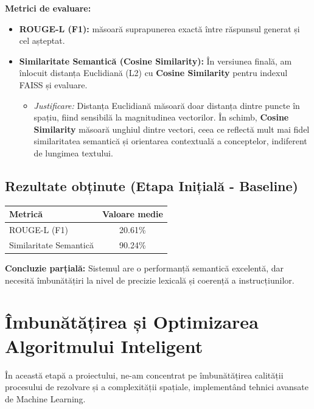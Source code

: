 \documentclass[12pt,a4paper]{report}
\begin{document}
\textbf{Metrici de evaluare:}
\begin{itemize}
  \item \textbf{ROUGE-L (F1):} măsoară suprapunerea exactă între răspunsul generat și cel așteptat.
  \item \textbf{Similaritate Semantică (Cosine Similarity):} În versiunea finală, am înlocuit distanța Euclidiană (L2) cu \textbf{Cosine Similarity} pentru indexul FAISS și evaluare.
  \begin{itemize}
      \item \textit{Justificare:} Distanța Euclidiană măsoară doar distanța dintre puncte în spațiu, fiind sensibilă la magnitudinea vectorilor. În schimb, \textbf{Cosine Similarity} măsoară unghiul dintre vectori, ceea ce reflectă mult mai fidel similaritatea semantică și orientarea contextuală a conceptelor, indiferent de lungimea textului.
  \end{itemize}
\end{itemize}

\section{Rezultate obținute (Etapa Inițială - Baseline)}
\begin{center}
\begin{tabular}{|l|c|}
\hline
\textbf{Metrică} & \textbf{Valoare medie} \\
\hline
ROUGE-L (F1) & 20.61\% \\
\hline
Similaritate Semantică & 90.24\% \\
\hline
\end{tabular}
\end{center}

\textbf{Concluzie parțială:} Sistemul are o performanță semantică excelentă, dar necesită îmbunătățiri la nivel de precizie lexicală și coerență a instrucțiunilor.

\chapter{Îmbunătățirea și Optimizarea Algoritmului Inteligent}

În această etapă a proiectului, ne-am concentrat pe îmbunătățirea calității procesului de rezolvare și a complexității spațiale, implementând tehnici avansate de Machine Learning.
\end{document}
